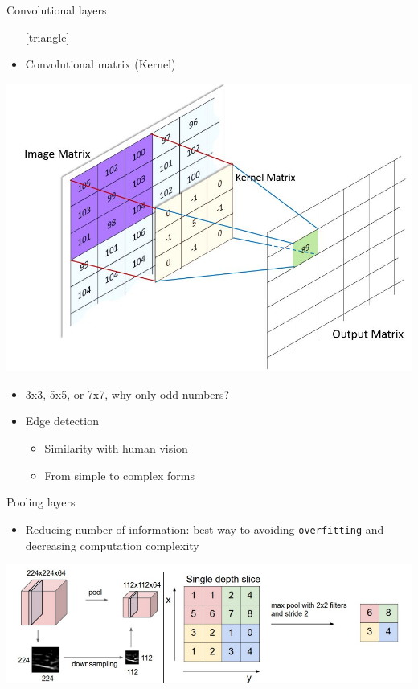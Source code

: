 \documentclass{beamer}
\begin{document}
\begin{frame}{Convolutional layers}
\begin{itemize}
\setlength\itemsep{1em}
[triangle]
\item Convolutional matrix (Kernel)
\end{itemize}
\begin{center}
\includegraphics[scale=0.2]{kernel}
\end{center}
\begin{itemize}
\setlength\itemsep{1em}
[triangle]
\item 3x3, 5x5, or 7x7, why only odd numbers?
\item Edge detection
\begin{itemize}
[circle]
\item Similarity with human vision
\item From simple to complex forms
\end{itemize}
\end{itemize}
\end{frame}

\begin{frame}{Pooling layers}
\begin{itemize}
\setlength\itemsep{1em}
[triangle]
\item Reducing number of information: best way to avoiding \texttt{overfitting} and decreasing computation complexity
\end{itemize}
\includegraphics[scale=0.35]{pooling}
\end{frame}
\end{document}
